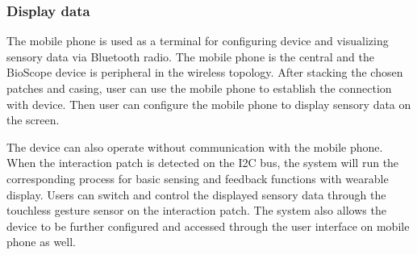 \subsubsection{Display data}
The mobile phone is used as a terminal for configuring device and visualizing sensory data via Bluetooth radio.
The mobile phone is the central and the BioScope device is peripheral in the wireless topology.
After stacking the chosen patches and casing, user can use the mobile phone to establish the connection with device.
Then user can configure the mobile phone to display sensory data on the screen.

The device can also operate without communication with the mobile phone.
When the interaction patch is detected on the I2C bus, the system will run the corresponding process for basic sensing and feedback functions with wearable display.
Users can switch and control the displayed sensory data through the touchless gesture sensor on the interaction patch.
The system also allows the device to be further configured and accessed through the user interface on mobile phone as well.

